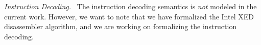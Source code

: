 \emph{Instruction Decoding.~}
The instruction decoding semantics is \emph{not} modeled in the current work. However, we want to note that we have formalized the Intel XED disassembler algorithm, and we are working on formalizing the instruction decoding.
%
%
